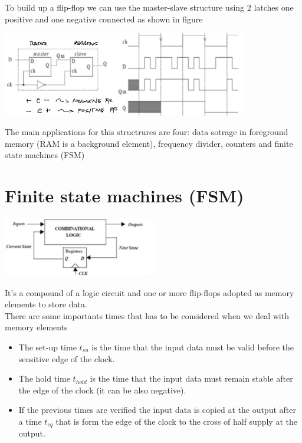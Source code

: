 To build up a flip-flop we can use the master-slave structure using 2 latches one positive and one negative connected as shown in figure

\vspace{5mm}
\centering
\includegraphics[width=0.8\textwidth]{C10_4.png}\\
\raggedright
\vspace{5mm}

The main applications for this structrures are four: data sotrage in foreground memory (RAM is a background element), frequency divider, counters and finite state machines (FSM)





\section{Finite state machines (FSM)}

\centering
\includegraphics[width=0.5\textwidth]{C10_5.png}\\
\raggedright

It’s a compound of a logic circuit and one or more flip-flops adopted as memory elements to store data.\\
\vspace{3mm}
There are some importants times that has to be considered when we deal with memory elements
\begin{itemize}

\item The set-up time $t_{su}$ is the time that the input data must be valid before the sensitive edge of the clock.

\item The hold time $t_{hold}$ is the time that the input data must remain stable after the edge of the clock (it can be also negative).

\item If the previous times are verified the input data is copied at the output after a time $t_{cq}$ that is form the edge of the clock to the cross of half supply at the output.

\end{itemize}

